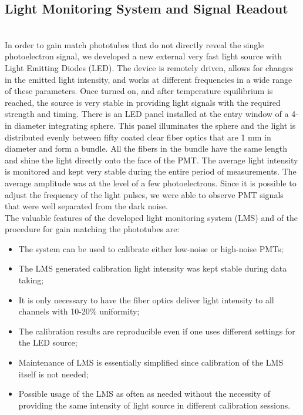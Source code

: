 \subsection{Light Monitoring System and Signal Readout}
\indent
 \\
 \indent In order to gain match phototubes that do not directly reveal the single photoelectron signal, we developed a new external very fast light source with Light Emitting Diodes (LED). The device is remotely driven, allows for changes in the emitted light intensity, and works at different frequencies in a wide range of these parameters. Once turned on, and after temperature equilibrium is reached, the source is very stable in providing light signals with the required strength and timing. There is an LED panel installed at the entry window of a 4-in diameter integrating sphere. This panel illuminates the sphere and the light is distributed evenly between fifty coated clear fiber optics that are 1 mm in diameter and form a bundle. All the fibers in the bundle have the same length and shine the light directly onto the face of the PMT. The average light intensity is monitored and kept very stable during the entire period of measurements. The average amplitude was at the level of a few photoelectrons. Since it is possible to adjust the frequency of the light pulses, we were able to observe PMT signals that were well separated from the dark noise.\\ 
 \indent The valuable features of the developed light monitoring system (LMS) and of the procedure for gain matching the phototubes are:
 
 \begin{itemize}
     \item The system can be used to calibrate either low-noise or high-noise PMTs;
     \item The LMS generated calibration light intensity was kept stable during data taking;
     \item It is only necessary to have the fiber optics deliver light intensity to all channels with 10-20\% uniformity;
     \item The calibration results are reproducible even if one uses different settings for the LED source;
     \item Maintenance of LMS is essentially simplified since calibration of the LMS itself is not needed;
     \item Possible usage of the LMS as often as needed without the necessity of providing the same intensity of light source in different calibration sessions.
 \end{itemize}

